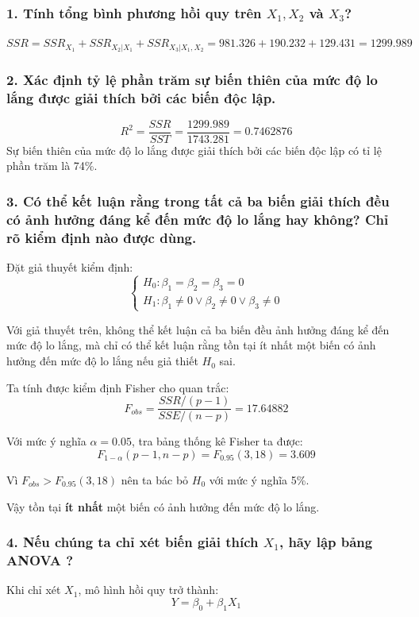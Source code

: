 \documentclass[a4paper]{article}
\theoremstyle{nonumberplain}
\begin{document}
\subsubsection*{1. Tính tổng bình phương hồi quy trên $X_1, X_2$ và $X_3$?}
$SSR = SSR_{X_1} + SSR_{X_2|X_1} + SSR_{X_3|X_1,X_2} = 981.326 + 190.232 + 129.431 = 1299.989$
\subsubsection*{2. Xác định tỷ lệ phần trăm sự biến thiên của mức độ lo lắng được giải thích bởi các biến độc lập.}

\[R^2 = \dfrac{SSR}{SST} = \dfrac{1299.989}{1743.281} = 0.7462876\]
Sự biến thiên của mức độ lo lắng được giải thích bởi các biến độc lập có tỉ lệ phần trăm là 74\%.

\subsubsection*{3. Có thể kết luận rằng trong tất cả ba biến giải thích đều có ảnh hưởng đáng kể đến mức độ lo lắng hay không? Chỉ rõ kiểm định nào được dùng.}

Đặt giả thuyết kiểm định:
\[\begin{cases}
	H_0: \beta_1 = \beta_2 = \beta_3 = 0\\
	H_1: \beta_1 \neq 0 \vee \beta_2 \neq 0 \vee \beta_3 \neq 0
\end{cases}\]

Với giả thuyết trên, không thể kết luận cả ba biến đều ảnh hưởng đáng kể đến mức độ lo lắng, mà chỉ có thể kết luận rằng tồn tại ít nhất một biến có ảnh hưởng đến mức độ lo lắng nếu giả thiết $H_0$ sai.

Ta tính được kiểm định Fisher cho quan trắc:
\[F_{obs} = \dfrac{SSR/(p-1)}{SSE/(n-p)} = 17.64882\]

Với mức ý nghĩa $\alpha = 0.05$, tra bảng thống kê Fisher ta được:
\[F_{1-\alpha}(p-1,n-p) = F_{0.95}(3,18) = 3.609\]

Vì $F_{obs} > F_{0.95}(3,18)$ nên ta bác bỏ $H_0$ với mức ý nghĩa 5\%.

Vậy tồn tại \textbf{ít nhất} một biến có ảnh hưởng đến mức độ lo lắng.

\subsubsection*{4. Nếu chúng ta chỉ xét biến giải thích $X_1$, hãy lập bảng ANOVA ?}

Khi chỉ xét $X_1$, mô hình hồi quy trở thành:
\[Y = \beta_0 + \beta_1X_1\]
\end{document}
